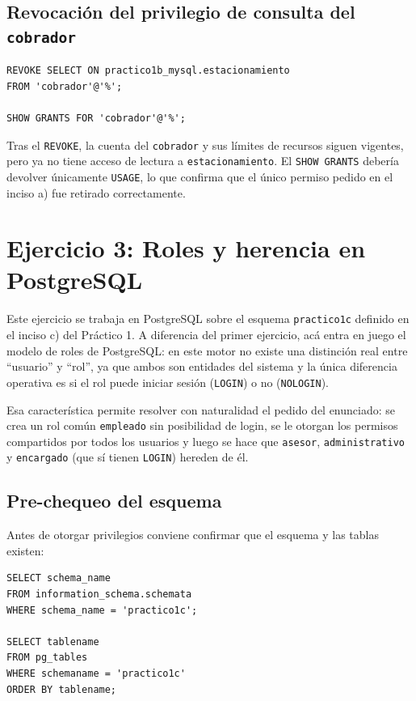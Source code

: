 \documentclass[11pt,a4paper]{article}
\begin{document}
\subsection{Revocación del privilegio de consulta del \texttt{cobrador}}

\begin{lstlisting}
REVOKE SELECT ON practico1b_mysql.estacionamiento
FROM 'cobrador'@'%';

SHOW GRANTS FOR 'cobrador'@'%';
\end{lstlisting}

Tras el \texttt{REVOKE}, la cuenta del \texttt{cobrador} y sus límites de recursos siguen vigentes, pero ya no tiene acceso de lectura a \texttt{estacionamiento}. El \texttt{SHOW GRANTS} debería devolver únicamente \texttt{USAGE}, lo que confirma que el único permiso pedido en el inciso a) fue retirado correctamente.

\section{Ejercicio 3: Roles y herencia en PostgreSQL}

Este ejercicio se trabaja en PostgreSQL sobre el esquema \texttt{practico1c} definido en el inciso c) del Práctico 1. A diferencia del primer ejercicio, acá entra en juego el modelo de roles de PostgreSQL: en este motor no existe una distinción real entre ``usuario'' y ``rol'', ya que ambos son entidades del sistema y la única diferencia operativa es si el rol puede iniciar sesión (\texttt{LOGIN}) o no (\texttt{NOLOGIN}).

Esa característica permite resolver con naturalidad el pedido del enunciado: se crea un rol común \texttt{empleado} sin posibilidad de login, se le otorgan los permisos compartidos por todos los usuarios y luego se hace que \texttt{asesor}, \texttt{administrativo} y \texttt{encargado} (que sí tienen \texttt{LOGIN}) hereden de él.

\subsection{Pre-chequeo del esquema}

Antes de otorgar privilegios conviene confirmar que el esquema y las tablas existen:

\begin{lstlisting}
SELECT schema_name
FROM information_schema.schemata
WHERE schema_name = 'practico1c';

SELECT tablename
FROM pg_tables
WHERE schemaname = 'practico1c'
ORDER BY tablename;
\end{lstlisting}
\end{document}
